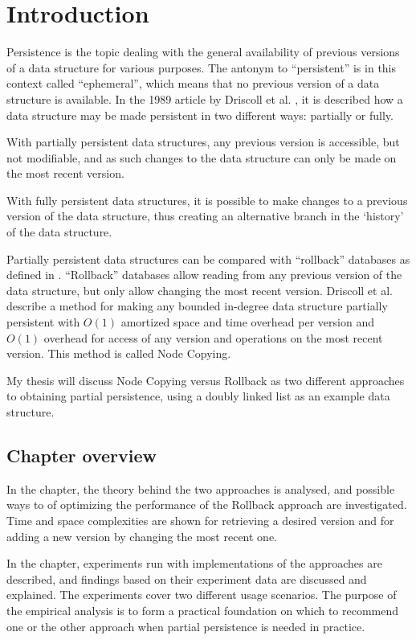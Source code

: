 \chapter{Introduction}
Persistence is the topic dealing with the general availability of previous
versions of a data structure for various purposes. The antonym to ``persistent''
is in this context called ``ephemeral'', which means that no previous version of
a data structure is available. In the 1989 article by Driscoll et al.
\cite{Driscoll198986}, it is described how a data structure may be made
persistent in two different ways: partially or fully.

With partially persistent data structures, any previous version is accessible,
but not modifiable, and as such changes to the data structure can only be made
on the most recent version.

With fully persistent data structures, it is possible to make changes to a
previous version of the data structure, thus creating an alternative branch in
the `history' of the data structure.

Partially persistent data structures can be compared with ``rollback'' databases
as defined in \cite{10.1109/AFIPS.1987.11}. ``Rollback'' databases allow reading
from any previous version of the data structure, but only allow changing the
most recent version.
Driscoll et al. describe a method for making any bounded in-degree data
structure partially persistent with $O(1)$ amortized space and time overhead per
version and $O(1)$ overhead for access of any version and operations on the most
recent version. This method is called Node Copying.

My thesis will discuss Node Copying versus Rollback as two different approaches
to obtaining partial persistence, using a doubly linked list as an example data
structure.

\section{Chapter overview}
In the  chapter, the theory behind the two approaches is
analysed, and possible ways to of optimizing the performance of the Rollback
approach are investigated. Time and space complexities are shown for retrieving
a desired version and for adding a new version by changing the most recent one.

In the  chapter, experiments run with
implementations of the approaches are described, and findings based on their
experiment data are discussed and explained. The experiments cover two different
usage scenarios. The purpose of the empirical analysis is to form a practical
foundation on which to recommend one or the other approach when partial
persistence is needed in practice.


